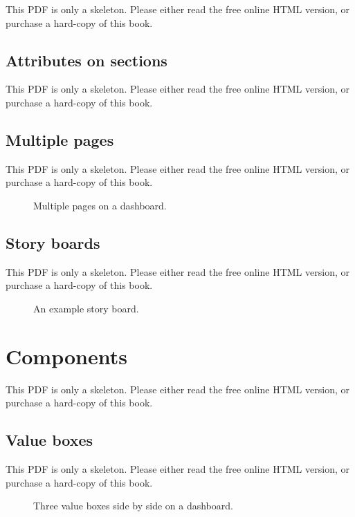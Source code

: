 \documentclass[
  11pt,
]{krantz}
\theoremstyle{definition}
\theoremstyle{definition}
\theoremstyle{definition}
\theoremstyle{definition}
\theoremstyle{remark}
\begin{document}
This PDF is only a skeleton. Please either read the free online HTML version, or purchase a hard-copy of this book.

\subsection{Attributes on sections}\label{attributes-on-sections}

This PDF is only a skeleton. Please either read the free online HTML version, or purchase a hard-copy of this book.

\subsection{Multiple pages}\label{multiple-pages}

This PDF is only a skeleton. Please either read the free online HTML version, or purchase a hard-copy of this book.

\begin{figure}\caption{Multiple pages on a dashboard.}\end{figure}

\subsection{Story boards}\label{story-boards}

This PDF is only a skeleton. Please either read the free online HTML version, or purchase a hard-copy of this book.

\begin{figure}\caption{An example story board.}\end{figure}

\section{Components}\label{dashboard-components}

This PDF is only a skeleton. Please either read the free online HTML version, or purchase a hard-copy of this book.

\subsection{Value boxes}\label{value-boxes}

This PDF is only a skeleton. Please either read the free online HTML version, or purchase a hard-copy of this book.

\begin{figure}\caption{Three value boxes side by side on a dashboard.}\end{figure}
\end{document}
